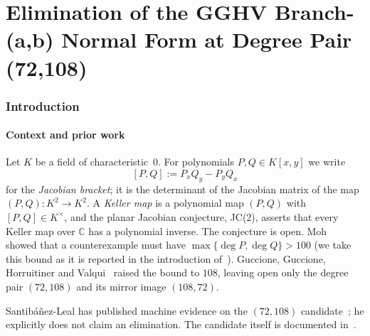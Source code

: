 \documentclass[a4paper,11pt]{article}
\theoremstyle{jsplain}
\theoremstyle{jsdef}
\theoremstyle{jsrem}
\begin{document}
\part{\texorpdfstring{Elimination of the GGHV Branch-(a,b) Normal Form at Degree Pair (72,108)}{Elimination of the GGHV Branch-(a,b) Normal Form at Degree Pair (72,108)}}

\section{Introduction}

\subsection{Context and prior work}

Let $K$ be a field of characteristic~$0$. For polynomials $P,Q\in K[x,y]$ we write
\[
[P,Q]:=P_xQ_y-P_yQ_x
\]
for the \emph{Jacobian bracket}; it is the determinant of the Jacobian matrix of the map $(P,Q)\colon K^2\to K^2$. A \emph{Keller map} is a polynomial map $(P,Q)$ with $[P,Q]\in K^\times$, and the planar Jacobian conjecture, JC(2), asserts that every Keller map over $\mathbb{C}$ has a polynomial inverse. The conjecture is open. Moh~\cite{Moh} showed that a counterexample must have $\max\{\deg P,\deg Q\}>100$ (we take this bound as it is reported in the introduction of~\cite{GGHV}). Guccione, Guccione, Horruitiner and Valqui~\cite{GGHV} raised the bound to $108$, leaving open only the degree pair $(72,108)$ and its mirror image $(108,72)$.

Santib\'a\~nez-Leal has published machine evidence on the $(72,108)$ candidate~\cite{Santibanez,SantibanezPaper}; he explicitly does not claim an elimination. The candidate itself is documented in~\cite{JC125note}.
\end{document}
